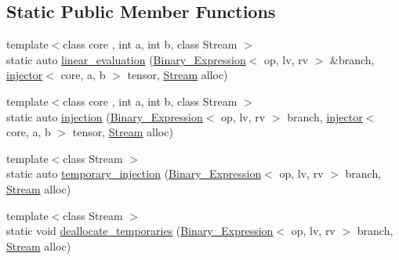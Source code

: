 \subsection*{Static Public Member Functions}
\begin{DoxyCompactItemize}
\item 
{\footnotesize template$<$class core , int a, int b, class Stream $>$ }\\static auto \hyperlink{structBC_1_1tensors_1_1exprs_1_1optimizer_3_01Binary__Expression_3_01op_00_01lv_00_01rv_01_4_00_f6303e0a787eb8566b71e5cc034a3dd8_a7b29963e711bc5431ac39b0a115d6273}{linear\+\_\+evaluation} (\hyperlink{structBC_1_1tensors_1_1exprs_1_1Binary__Expression}{Binary\+\_\+\+Expression}$<$ op, lv, rv $>$ \&branch, \hyperlink{structBC_1_1tensors_1_1exprs_1_1injector}{injector}$<$ core, a, b $>$ tensor, \hyperlink{namespaceBC_abc64a63cd29a22d102a68f478dfd588d}{Stream} alloc)
\item 
{\footnotesize template$<$class core , int a, int b, class Stream $>$ }\\static auto \hyperlink{structBC_1_1tensors_1_1exprs_1_1optimizer_3_01Binary__Expression_3_01op_00_01lv_00_01rv_01_4_00_f6303e0a787eb8566b71e5cc034a3dd8_a98e6bde7e44ec28ea6aadcd74fd5cbe9}{injection} (\hyperlink{structBC_1_1tensors_1_1exprs_1_1Binary__Expression}{Binary\+\_\+\+Expression}$<$ op, lv, rv $>$ branch, \hyperlink{structBC_1_1tensors_1_1exprs_1_1injector}{injector}$<$ core, a, b $>$ tensor, \hyperlink{namespaceBC_abc64a63cd29a22d102a68f478dfd588d}{Stream} alloc)
\item 
{\footnotesize template$<$class Stream $>$ }\\static auto \hyperlink{structBC_1_1tensors_1_1exprs_1_1optimizer_3_01Binary__Expression_3_01op_00_01lv_00_01rv_01_4_00_f6303e0a787eb8566b71e5cc034a3dd8_a172b51b856d511238617435882f2a103}{temporary\+\_\+injection} (\hyperlink{structBC_1_1tensors_1_1exprs_1_1Binary__Expression}{Binary\+\_\+\+Expression}$<$ op, lv, rv $>$ branch, \hyperlink{namespaceBC_abc64a63cd29a22d102a68f478dfd588d}{Stream} alloc)
\item 
{\footnotesize template$<$class Stream $>$ }\\static void \hyperlink{structBC_1_1tensors_1_1exprs_1_1optimizer_3_01Binary__Expression_3_01op_00_01lv_00_01rv_01_4_00_f6303e0a787eb8566b71e5cc034a3dd8_a7196f95de200799b3d5de83efed6b5e5}{deallocate\+\_\+temporaries} (\hyperlink{structBC_1_1tensors_1_1exprs_1_1Binary__Expression}{Binary\+\_\+\+Expression}$<$ op, lv, rv $>$ branch, \hyperlink{namespaceBC_abc64a63cd29a22d102a68f478dfd588d}{Stream} alloc)
\end{DoxyCompactItemize}
